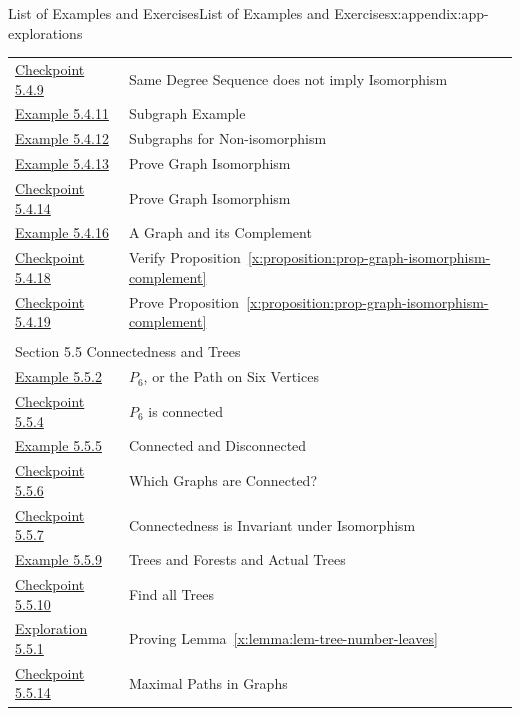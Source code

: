 \documentclass[oneside,10pt,]{book}
\newcommand{\xreffont}{\relax}
\numberwithin{equation}{section}
\begin{document}
\begin{appendixptx}{List of Examples and Exercises}{}{List of Examples and Exercises}{}{}{x:appendix:app-explorations}
\begin{longtable}[l]{ll}
\hyperref[x:exercise:ex-graph-isomorphism-degree-converse]{Checkpoint 5.4.9}& Same Degree Sequence does not imply Isomorphism\\
\hyperref[x:example:eg-subgraph]{Example 5.4.11}& Subgraph Example\\
\hyperref[x:example:eg-subgraph-not-isomorphic]{Example 5.4.12}& Subgraphs for Non-isomorphism\\
\hyperref[x:example:eg-graph-construct-isomorphism]{Example 5.4.13}& Prove Graph Isomorphism\\
\hyperref[x:exercise:ex-graph-prove-isomorphic]{Checkpoint 5.4.14}& Prove Graph Isomorphism\\
\hyperref[x:example:eg-graph-complement]{Example 5.4.16}& A Graph and its Complement\\
\hyperref[x:exercise:ex-graph-isomorphism-complement]{Checkpoint 5.4.18}& Verify Proposition~{\xreffont\ref*{x:proposition:prop-graph-isomorphism-complement}}\\
\hyperref[x:exercise:ex-graph-prove-complement]{Checkpoint 5.4.19}& Prove Proposition~{\xreffont\ref*{x:proposition:prop-graph-isomorphism-complement}}\\
\multicolumn{2}{l}{\null}\\[1.5ex] \multicolumn{2}{l}{\large Section 5.5 Connectedness and Trees}\\[0.5ex]
\hyperref[x:example:eg-path-graph]{Example 5.5.2}& \(P_6\), or the Path on Six Vertices\\
\hyperref[x:exercise:ex-path-connected]{Checkpoint 5.5.4}& \(P_6\) is connected\\
\hyperref[x:example:eg-graph-connected-component]{Example 5.5.5}& Connected and Disconnected\\
\hyperref[x:exercise:ex-which-connected]{Checkpoint 5.5.6}& Which Graphs are Connected?\\
\hyperref[x:exercise:ex-isomorphic-connected]{Checkpoint 5.5.7}& Connectedness is Invariant under Isomorphism\\
\hyperref[x:example:eg-tree-forest]{Example 5.5.9}& Trees and Forests and Actual Trees\\
\hyperref[x:exercise:ex-nonisomorphic-trees]{Checkpoint 5.5.10}& Find all Trees\\
\hyperref[x:exploration:expl-tree-number-leaves]{Exploration 5.5.1}& Proving Lemma~{\xreffont\ref*{x:lemma:lem-tree-number-leaves}}\\
\hyperref[x:exercise:ex-maximal-paths]{Checkpoint 5.5.14}& Maximal Paths in Graphs\\

\end{longtable}
\end{appendixptx}
\end{document}
